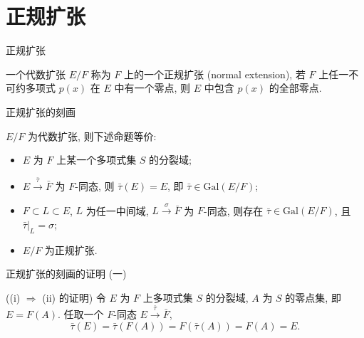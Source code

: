
\section[正规]{正规扩张}


\begin{frame}{正规扩张}

\begin{Def}[正规扩张]
一个代数扩张 $E/F$ 称为 $F$ 上的一个正规扩张
(normal extension), 若 $F$ 上任一不可约多项式 $p(x)$ 在 $E$ 中有一个零点,
则 $E$ 中包含 $p(x)$ 的全部零点.
\end{Def}

\end{frame}


\begin{frame}{正规扩张的刻画}

\begin{lem}[正规扩张的刻画]
$E/F$ 为代数扩张, 则下述命题等价:
\begin{itemize}
\item[(i)] $E$ 为 $F$ 上某一个多项式集 $S$ 的分裂域;
\item[(ii)] $E \xrightarrow{\ \bar{\tau}\ } \bar{F}$ 为 $F$-同态,
  则 $\bar{\tau}(E) = E$, 即 $\bar{\tau} \in \mathrm{Gal}(E/F)$;
\item[(iii)] $F \subset L \subset E$, $L$ 为任一中间域,
  $L \xrightarrow{\ \sigma\ } \bar{F}$ 为 $F$-同态, 则存在
  $\bar{\tau} \in \mathrm{Gal}(E/F)$, 且 $\bar{\tau}|_L = \sigma$;
\item[(iv)] $E/F$ 为正规扩张.
\end{itemize}
\end{lem}

\end{frame}


\begin{frame}{正规扩张的刻画的证明 (一)}

\startproof[bg=yellow, fg=red]((i) $\Longrightarrow$ (ii) 的证明)
令 $E$ 为 $F$ 上多项式集 $S$ 的分裂域, $A$ 为 $S$ 的零点集, 即 $E = F(A)$.
任取一个 $F$-同态 $E \xrightarrow{\ \bar{\tau}\ } \bar{F}$,
\[
\bar{\tau}(E) = \bar{\tau}(F(A)) = F(\bar{\tau}(A)) = F(A) = E.
\]

\end{frame}

